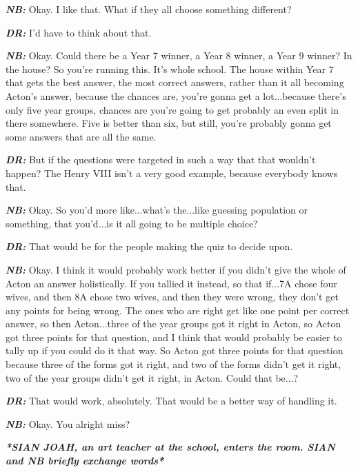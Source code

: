 \textit{\textbf{NB:}} Okay. I like that. What if they all choose something different?

\textit{\textbf{DR:}} I'd have to think about that.

\textit{\textbf{NB:}} Okay. Could there be a Year 7 winner, a Year 8 winner, a Year 9 winner? In the house? So you're running this. It's whole school. The house within Year 7 that gets the best answer, the most correct answers, rather than it all becoming Acton's answer, because the chances are, you're gonna get a lot...because there's only five year groups, chances are you're going to get probably an even split in there somewhere. Five is better than six, but still, you're probably gonna get some answers that are all the same.

\textit{\textbf{DR:}} But if the questions were targeted in such a way that that wouldn't happen? The Henry VIII isn't a very good example, because everybody knows that.

\textit{\textbf{NB:}} Okay. So you'd more like...what's the...like guessing population or something, that you'd...is it all going to be multiple choice?

\textit{\textbf{DR:}} That would be for the people making the quiz to decide upon.

\textit{\textbf{NB:}} Okay. I think it would probably work better if you didn't give the whole of Acton an answer holistically. If you tallied it instead, so that if...7A chose four wives, and then 8A chose two wives, and then they were wrong, they don't get any points for being wrong. The ones who are right get like one point per correct answer, so then Acton...three of the year groups got it right in Acton, so Acton got three points for that question, and I think that would probably be easier to tally up if you could do it that way. So Acton got three points for that question because three of the forms got it right, and two of the forms didn't get it right, two of the year groups didn't get it right, in Acton. Could that be...?

\textit{\textbf{DR:}} That would work, absolutely. That would be a better way of handling it.

\textit{\textbf{NB:}} Okay. You alright miss?\\

\begin{center}
\textit{\textbf{*SIAN JOAH, an art teacher at the school, enters the room. SIAN and NB briefly exchange words*}}
\end{center}

